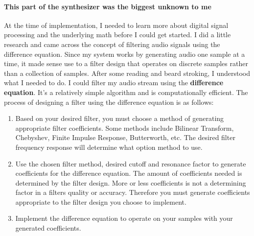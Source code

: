 \documentclass[acmlarge,screen]{acmart}
\begin{document}
	\paragraph{This part of the synthesizer was the biggest unknown to me} At the time of implementation, I needed to learn more about digital signal processing and the underlying math before I could get started. I did a little research and came across the concept of filtering audio signals using the difference equation. Since my system works by generating audio one sample at a time, it made sense use to a filter design that operates on discrete samples rather than a collection of samples. After some reading and beard stroking, I understood what I needed to do. I could filter my audio stream using the \textbf{difference equation}\cite{duke_2000}. It's a relatively simple algorithm and is computationally efficient. The process of designing a filter using the difference equation is as follows:
	
	\begin{enumerate}
		\item Based on your desired filter, you must choose a method of generating appropriate filter coefficients. Some methods include Bilinear Transform, Chebyshev, Finite Impulse Response, Butterworth, etc. The desired filter frequency response will determine what option method to use.
		\item Use the chosen filter method, desired cutoff and resonance factor to generate coefficients for the difference equation. The amount of coefficients needed is determined by the filter design. More or less coefficients is not a determining factor in a filters quality or accuracy. Therefore you must generate coefficients appropriate to the filter design you choose to implement.
		\item Implement the difference equation to operate on your samples with your generated coefficients.
	\end{enumerate}
\end{document}
